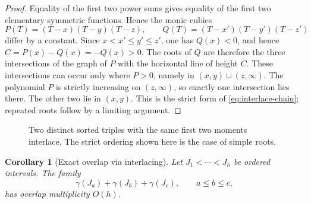 \documentclass{amsart}
\numberwithin{equation}{section}
\newtheorem{corollary}[theorem]{Corollary}
\begin{document}
\begin{proof}
Equality of the first two power sums gives equality of the first two
elementary symmetric functions.  Hence the monic cubics
\[
 P(T)=(T-x)(T-y)(T-z),
 \qquad
 Q(T)=(T-x')(T-y')(T-z')
\]
differ by a constant.  Since $x<x'\le y'\le z'$, one has $Q(x)<0$, and hence
$C=P(x)-Q(x)=-Q(x)>0$.  The roots of $Q$ are therefore the three intersections of the
graph of $P$ with the horizontal line of height $C$.  These intersections can
occur only where $P>0$, namely in $(x,y)\cup(z,\infty)$.  The polynomial $P$
is strictly increasing on $(z,\infty)$, so exactly one intersection lies
there.  The other two lie in $(x,y)$.  This is the strict form of
\eqref{eq:interlace-chain}; repeated roots follow by a limiting argument.
\end{proof}

\begin{figure}[htbp]
\centering
{}
\caption{Two distinct sorted triples with the same first two
moments interlace. The strict ordering shown here is the case of
simple roots.}
\label{fig:interlacing}
\end{figure}

\begin{corollary}[Exact overlap via interlacing]\label{cor:exact-triple-overlap}
Let $J_1<\cdots<J_h$ be ordered intervals.  The family
\[
 \gamma(J_a)+\gamma(J_b)+\gamma(J_c),
 \qquad a\le b\le c,
\]
has overlap multiplicity $O(h)$.
\end{corollary}
\end{document}
